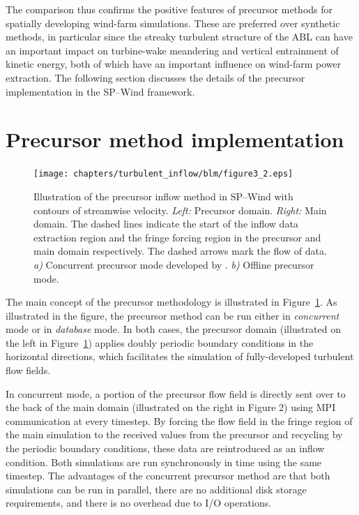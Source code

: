 	The comparison thus confirms the positive features of precursor methods for spatially developing wind-farm simulations. These are preferred over synthetic methods, in particular since the streaky turbulent structure of the ABL can have an important impact on turbine-wake meandering and vertical entrainment of kinetic energy, both of which have an important influence on wind-farm power extraction. The following section discusses the details of the precursor implementation in the SP--Wind framework.
	
\section{Precursor method implementation}\label{sec:inflow_CP}	
\begin{figure}
	\centering
	\texttt{[image: chapters/turbulent\_inflow/blm/figure3\_2.eps]}
	\caption{Illustration of the precursor inflow method in SP--Wind with contours of streamwise velocity. \textit{Left:} Precursor domain. \textit{Right: } Main domain. The dashed lines indicate the start of the inflow data extraction region and the fringe forcing region in the precursor and main domain respectively. The dashed arrows mark the flow of data. \emph{a)} Concurrent precursor mode developed by \cite{stevens2014concurrent}. \emph{b)} Offline precursor mode. \label{fig:CP0}}	
\end{figure}

The main concept of the precursor methodology is illustrated in Figure~\ref{fig:CP0}. As illustrated in the figure, the precursor method can be run either in \emph{concurrent} mode \citep{stevens2014concurrent} or in \emph{database} mode. In both cases, the precursor domain (illustrated on the left in Figure~\ref{fig:CP0}) applies doubly periodic boundary conditions in the horizontal directions, which facilitates the simulation of fully-developed turbulent flow fields. 

In concurrent mode, a portion of the precursor flow field is directly sent over to the back of the main domain (illustrated on the right in Figure 2) using MPI communication at every timestep. By forcing the flow field in the fringe region of the main simulation to the received values from the precursor and recycling by the periodic boundary conditions, these data are reintroduced as an inflow condition. Both simulations are run synchronously in time using the same timestep. The advantages of the concurrent precursor method are that both simulations can be run in parallel, there are no additional disk storage requirements, and there is no overhead due to I/O operations.

